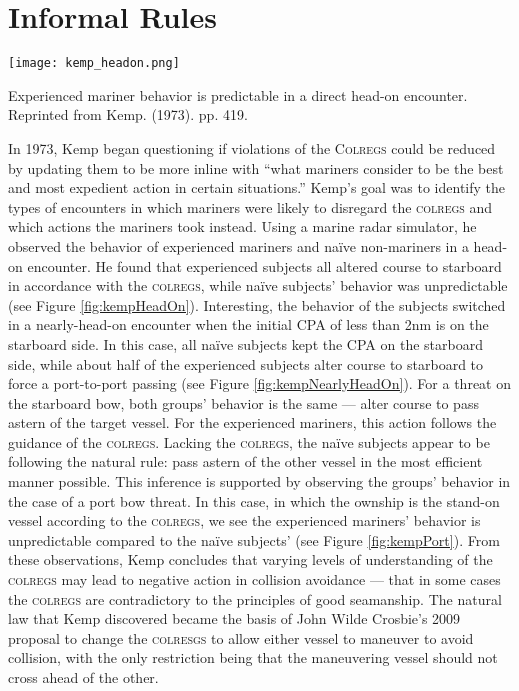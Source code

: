 \documentclass[twoside,symmetric,notoc]{tufte-book}
\begin{document}
\section{Informal Rules}
\par{%
\begin{marginfigure}[1.95in]
\centering
	\texttt{[image: kemp\_headon.png]}
	\caption[Experienced mariner behavior is predictable in a direct head-on encounter.]{Experienced mariner behavior is predictable in a direct head-on encounter. Reprinted from Kemp. (1973). pp. 419.}
	\label{fig:kempHeadOn}
	\forcerectofloat
\end{marginfigure}
In 1973, Kemp began questioning if violations of the \textsc{Colregs} could be reduced by updating them to be more inline with ``what mariners consider to be the best and most expedient action in certain situations.''\cite{Kemp_1973} Kemp's goal was to identify the types of encounters in which mariners were likely to disregard the \textsc{colregs} and which actions the mariners took instead. Using a marine radar simulator, he observed the behavior of experienced mariners and na\"ive non-mariners in a head-on encounter. He found that experienced subjects all altered course to starboard in accordance with the \textsc{colregs}, while na\"ive subjects' behavior was unpredictable (see Figure \ref{fig:kempHeadOn}). Interesting, the behavior of the subjects switched in a nearly-head-on encounter when the initial CPA of less than 2nm is on the starboard side. In this case, all na\"ive subjects kept the CPA on the starboard side, while about half of the experienced subjects alter course to starboard to force a port-to-port passing (see Figure \ref{fig:kempNearlyHeadOn}). For a threat on the starboard bow, both groups' behavior is the same --- alter course to pass astern of the target vessel. For the experienced mariners, this action follows the guidance of the \textsc{colregs}. Lacking the \textsc{colregs}, the na\"ive subjects appear to be following the natural rule: pass astern of the other vessel in the most efficient manner possible. This inference is supported by observing the groups' behavior in the case of a port bow threat. In this case, in which the ownship is the stand-on vessel according to the \textsc{colregs}, we see the experienced mariners' behavior is unpredictable compared to the na\"ive subjects' (see Figure \ref{fig:kempPort}). From these observations, Kemp concludes that varying levels of understanding of the \textsc{colregs} may lead to negative action in collision avoidance --- that in some cases the \textsc{colregs} are contradictory to the principles of good seamanship. The natural law that Kemp discovered became the basis of John Wilde Crosbie's 2009 proposal to change the \textsc{colresgs} to allow either vessel to maneuver to avoid collision, with the only restriction being that the maneuvering vessel should not cross ahead of the other.\cite[0.4in]{Crosbie}
}
\end{document}
